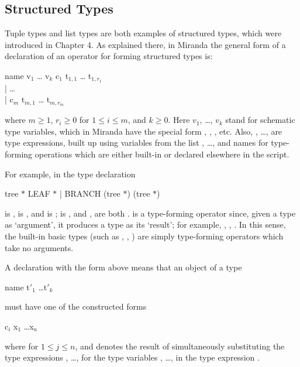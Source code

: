 \subsection{Structured Types}

Tuple types and list types are both examples of structured types, which were
introduced in Chapter 4. As explained there, in Miranda the general form of a
declaration of an operator for forming structured types is:
\begin{mlcoded}
    name v$_1$ \ldots{} v$_k$ \typedecl{} \quad c$_1$ t$_{1,1}$ \ldots{} t$_{1,r_1}$ \\
    \phantom{this is spacing hack} | \ldots \\
    \phantom{this is spacing hack} | c$_m$ t$_{m,1}$ \ldots{} t$_{m,r_m}$
\end{mlcoded}
where $m \geq 1$, $r_i \geq 0$ for $1 \leq i \leq m$, and $k \geq 0$. Here $v_1$, \ldots, $v_k$ stand for schematic type variables, which in Miranda have the special form \ml{$\ast$}, \ml{$\ast\ast$}, \ml{$\ast\ast\ast$}, etc. Also,
, \ldots,  are type expressions, built up using variables from the list , \ldots, 
and names for type-forming operations which are either built-in or declared
elsewhere in the script.

For example, in the type declaration
\begin{mlcoded}
    tree $\ast$ \typedecl{} LEAF $\ast$ | BRANCH (tree $\ast$) (tree $\ast$)
\end{mlcoded}
 is \ml{$\ast$},  is , and  is \ml{$\ast$};  is , and ,  are both .
 is a type-forming operator since, given a type as `argument', it produces a
type as its `result'; for example, , , . In
this sense, the built-in basic types (such as , , ) are simply type-forming operators which take no arguments.

A declaration with the form above means that an object of a type
\begin{mlcoded}
    name t$'_1$ \ldots t$'_k$
\end{mlcoded}
must have one of the constructed forms
\begin{mlcoded}
    c$_i$ x$_1$ \ldots x$_n$
\end{mlcoded}
where  for $1 \leq j \leq n$, and  denotes the result of simultaneously
substituting the type expressions , \ldots,  for the type variables , \ldots,  in
the type expression .

